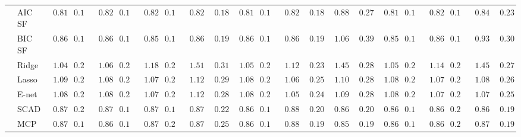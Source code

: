 \begin{tabular}{p{0.2cm}p{1cm}|p{0.6cm}p{0.6cm}|p{0.6cm}p{0.6cm}p{0.6cm}p{0.6cm}p{0.6cm}p{0.6cm}|p{0.6cm}p{0.6cm}p{0.6cm}p{0.6cm}p{0.6cm}p{0.6cm}|p{0.6cm}p{0.6cm}p{0.6cm}p{0.6cm}p{0.6cm}p{0.6cm}}
 & AIC SF  & $\phantom{0}0.81$ & $0.18$ & $\phantom{0}0.82$ & $0.18$ & $\phantom{0}0.82$ & $0.18$ & $\phantom{0}0.82$ & $\phantom{0}0.18$ & $\phantom{0}0.81$ & $0.17$ & $\phantom{0}0.82$ & $\phantom{0}0.18$ & $\phantom{0}0.88$ & $\phantom{0}0.27$ & $\phantom{0}0.81$ & $0.17$ & $\phantom{0}0.82$ & $0.18$ & $\phantom{0}0.84$ & $\phantom{0}0.23$ \\
 & BIC SF  & $\phantom{0}0.86$ & $0.18$ & $\phantom{0}0.86$ & $0.19$ & $\phantom{0}0.85$ & $0.18$ & $\phantom{0}0.86$ & $\phantom{0}0.19$ & $\phantom{0}0.86$ & $0.17$ & $\phantom{0}0.86$ & $\phantom{0}0.19$ & $\phantom{0}1.06$ & $\phantom{0}0.39$ & $\phantom{0}0.85$ & $0.18$ & $\phantom{0}0.86$ & $0.19$ & $\phantom{0}0.93$ & $\phantom{0}0.30$ \\
 & Ridge  & $\phantom{0}1.04$ & $0.21$ & $\phantom{0}1.06$ & $0.22$ & $\phantom{0}1.18$ & $0.24$ & $\phantom{0}1.51$ & $\phantom{0}0.31$ & $\phantom{0}1.05$ & $0.21$ & $\phantom{0}1.12$ & $\phantom{0}0.23$ & $\phantom{0}1.45$ & $\phantom{0}0.28$ & $\phantom{0}1.05$ & $0.23$ & $\phantom{0}1.14$ & $0.22$ & $\phantom{0}1.45$ & $\phantom{0}0.27$ \\
 & Lasso  & $\phantom{0}1.09$ & $0.25$ & $\phantom{0}1.08$ & $0.25$ & $\phantom{0}1.07$ & $0.25$ & $\phantom{0}1.12$ & $\phantom{0}0.29$ & $\phantom{0}1.08$ & $0.24$ & $\phantom{0}1.06$ & $\phantom{0}0.25$ & $\phantom{0}1.10$ & $\phantom{0}0.28$ & $\phantom{0}1.08$ & $0.24$ & $\phantom{0}1.07$ & $0.25$ & $\phantom{0}1.08$ & $\phantom{0}0.26$ \\
 & E-net  & $\phantom{0}1.08$ & $0.25$ & $\phantom{0}1.08$ & $0.25$ & $\phantom{0}1.07$ & $0.24$ & $\phantom{0}1.12$ & $\phantom{0}0.28$ & $\phantom{0}1.08$ & $0.24$ & $\phantom{0}1.05$ & $\phantom{0}0.24$ & $\phantom{0}1.09$ & $\phantom{0}0.28$ & $\phantom{0}1.08$ & $0.25$ & $\phantom{0}1.07$ & $0.25$ & $\phantom{0}1.07$ & $\phantom{0}0.25$ \\
 & SCAD  & $\phantom{0}0.87$ & $0.20$ & $\phantom{0}0.87$ & $0.19$ & $\phantom{0}0.87$ & $0.19$ & $\phantom{0}0.87$ & $\phantom{0}0.22$ & $\phantom{0}0.86$ & $0.18$ & $\phantom{0}0.88$ & $\phantom{0}0.20$ & $\phantom{0}0.86$ & $\phantom{0}0.20$ & $\phantom{0}0.86$ & $0.18$ & $\phantom{0}0.86$ & $0.20$ & $\phantom{0}0.86$ & $\phantom{0}0.19$ \\
 & MCP  & $\phantom{0}0.87$ & $0.19$ & $\phantom{0}0.86$ & $0.19$ & $\phantom{0}0.87$ & $0.20$ & $\phantom{0}0.87$ & $\phantom{0}0.25$ & $\phantom{0}0.86$ & $0.18$ & $\phantom{0}0.88$ & $\phantom{0}0.19$ & $\phantom{0}0.85$ & $\phantom{0}0.19$ & $\phantom{0}0.86$ & $0.18$ & $\phantom{0}0.86$ & $0.20$ & $\phantom{0}0.87$ & $\phantom{0}0.19$ \\

\end{tabular}
